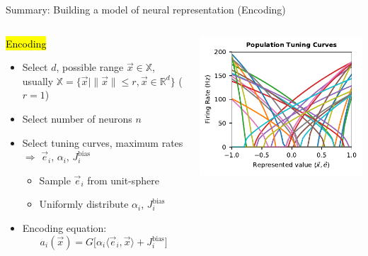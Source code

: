 \documentclass[handout,aspectratio=169]{beamer}
\begin{document}
\begin{frame}{Summary: Building a model of neural representation (Encoding)}
	\begin{columns}[c]
		\begin{block}{\hl{Encoding}}
		\begin{itemize}
			\setlength{\itemsep}{0.25cm}
			\item Select $d$, possible range $\vec x \in \mathbb{X}$, usually $\mathbb{X} = \big\{ \vec x \mid \| \vec x \| \leq r, \vec x \in \mathbb{R}^d \big\}$ ($r = 1$)
			\item Select number of neurons $n$
			\item Select tuning curves, maximum rates\\$\Rightarrow$ $\vec e_i$, $\alpha_i$, $J^\mathrm{bias}_i$\\[0.125cm]
			\begin{itemize}
				\setlength{\itemsep}{0.125cm}
				\item Sample $\vec e_i$ from unit-sphere
				\item Uniformly distribute $\alpha_i$, $J^\mathrm{bias}_i$
			\end{itemize}
			\item Encoding equation:\vspace{-0.25cm}
			$$a_i(\vec x) = G\big[ \alpha_i \langle \vec e_i, \vec x \rangle + J^\mathrm{bias}_i\big]$$
		\end{itemize}
		\end{block}
		\includegraphics{media/tuning_curves.pdf}
	\end{columns}
\end{frame}
\end{document}
